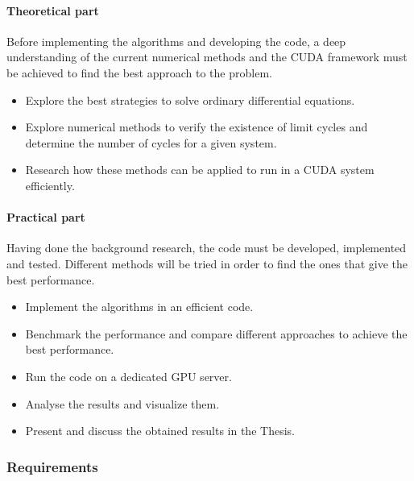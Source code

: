 \paragraph{Theoretical part}

Before implementing the algorithms and developing the code, a deep understanding
of the current numerical methods and the CUDA framework must be achieved to find
the best approach to the problem.

\begin{itemize}
    \item Explore the best strategies to solve ordinary differential equations.
    \item Explore numerical methods to verify the existence of limit cycles and determine the number of cycles for a given system.
    \item Research how these methods can be applied to run in a CUDA system efficiently.
\end{itemize}

\paragraph{Practical part}

Having done the background research, the code must be developed, implemented and
tested.  Different methods will be tried in order to find the ones that give the
best performance.

\begin{itemize}
    \item Implement the algorithms in an efficient code.
    \item Benchmark the performance and compare different approaches to achieve the best performance.
    \item Run the code on a dedicated GPU server.
    \item Analyse the results and visualize them.
    \item Present and discuss the obtained results in the Thesis.
\end{itemize}

\subsubsection{Requirements}

